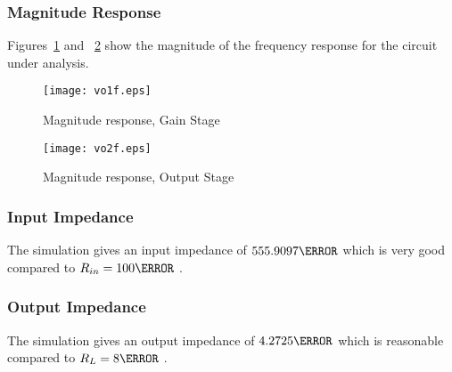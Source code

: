 \subsubsection{Magnitude Response}

Figures~\ref{fig:MRGS} and ~\ref{fig:MROS} show the magnitude of the frequency response for the
circuit under analysis.

\begin{figure}[h] \centering
\texttt{[image: vo1f.eps]}
\caption{Magnitude response, Gain Stage}
\label{fig:MRGS}
\end{figure}

\begin{figure}[h] \centering
\texttt{[image: vo2f.eps]}
\caption{Magnitude response, Output Stage}
\label{fig:MROS}
\end{figure}


\subsubsection{Input Impedance}
The simulation gives an input impedance of $555.9097 \ohm$ which is very good compared to $R_{in}=100\ohm$ .

\subsubsection{Output Impedance}
The simulation gives an output impedance of $4.2725 \ohm$ which is reasonable compared to $R_{L}=8\ohm$ .
